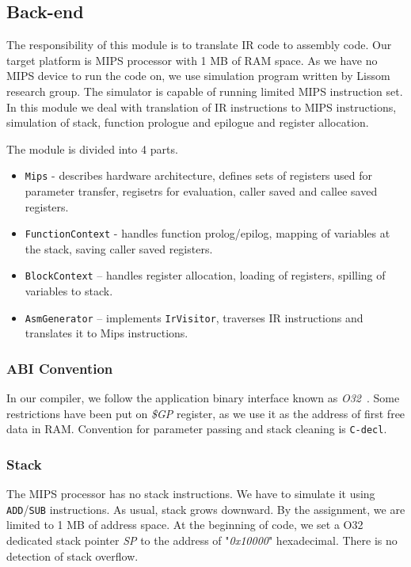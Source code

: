 \documentclass[12pt]{article}
\begin{document}
\subsection{Back-end}
The responsibility of this module is to translate IR code to assembly code. Our target platform is MIPS processor with 1 MB of RAM space. As we have no MIPS device to run the code on, we use simulation program written by Lissom research group. The simulator is capable of running limited MIPS instruction set. In this module we deal with translation of IR instructions to MIPS instructions, simulation of stack, function prologue and epilogue and register allocation.

The module is divided into 4 parts. 
\begin{itemize}
	\item \texttt{Mips} - describes hardware architecture, defines sets of registers used for parameter transfer, regisetrs for evaluation, caller saved and callee saved registers.
	\item \texttt{FunctionContext} - handles function prolog/epilog, mapping of variables at the stack, saving caller saved registers.
	\item \texttt{BlockContext} -- handles register allocation, loading of registers, spilling of variables to stack.
	\item \texttt{AsmGenerator} -- implements \texttt{IrVisitor}, traverses IR instructions and translates it to Mips instructions.
\end{itemize}

\subsubsection{ABI Convention}
In our compiler, we follow the application binary interface known as \textit{O32}~\cite{O32}. 
Some restrictions have been put on \textit{\$GP} register, as we use it as the address of first free data in RAM.
Convention for parameter passing and stack cleaning is \texttt{C-decl}.
\subsubsection{Stack}
The MIPS processor has no stack instructions. We have to simulate it using \texttt{ADD}/\texttt{SUB} instructions. As usual, stack grows downward. By the assignment, we are limited to 1 MB of address space. At the beginning of code, we set a O32 dedicated stack pointer \textit{SP} to the address of "\textit{0x10000}" hexadecimal. There is no detection of stack overflow.
\end{document}
